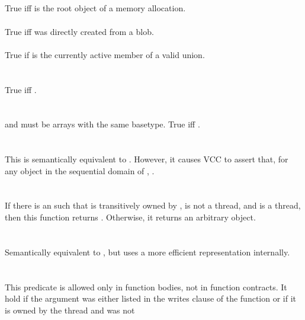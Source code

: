 \documentclass[preprint,nocopyrightspace]{sigplanconf}
\begin{document}
{{{\\
\\\\
\\
True iff  is the root object of a memory allocation.
\\
\\
True iff  was directly created from a blob.
\\
\\
True if  is the currently active member of a valid union.
\\\\
\\
True iff .
\\\\
\\
 and  must be arrays with the same basetype.
True iff .
\\\\
\\
This is semantically equivalent to . However, it
causes VCC to assert that, for any object  in the sequential
domain of , .
\\\\
\\
If there is an  such that  is transitively
owned by ,  is not a thread, and  is a
thread, then this function returns . Otherwise, it returns an
arbitrary object.
\\\\
\\
Semantically equivalent to , but
uses a more efficient representation internally.
\\\\
\\
This predicate is allowed only in function bodies, not in function
contracts. It hold if the argument was either listed in the writes
clause of the function or if it is owned by the thread and was not
}}}
\end{document}
